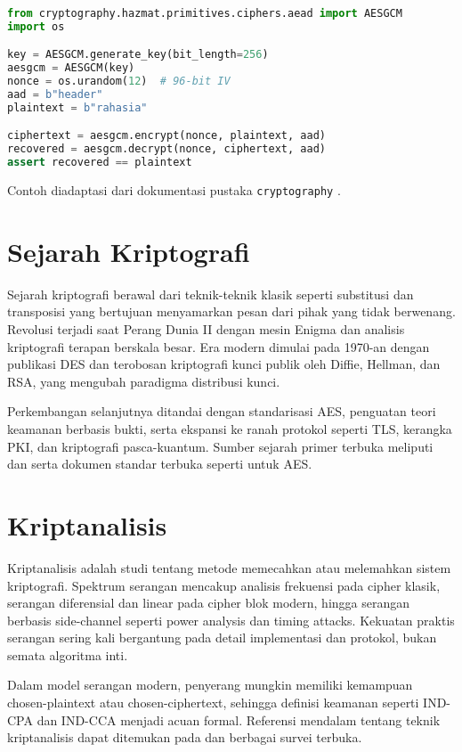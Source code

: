 \documentclass[../main.tex]{subfiles}
\begin{document}
\begin{lstlisting}[language=Python, caption={Contoh enkripsi-dekripsi AES-GCM di Python}, label={lst:aesgcm}]
from cryptography.hazmat.primitives.ciphers.aead import AESGCM
import os

key = AESGCM.generate_key(bit_length=256)
aesgcm = AESGCM(key)
nonce = os.urandom(12)  # 96-bit IV
aad = b"header"
plaintext = b"rahasia"

ciphertext = aesgcm.encrypt(nonce, plaintext, aad)
recovered = aesgcm.decrypt(nonce, ciphertext, aad)
assert recovered == plaintext
\end{lstlisting}

\noindent Contoh diadaptasi dari dokumentasi pustaka \texttt{cryptography} \parencite{cryptography-aesgcm-docs}.

\section{Sejarah Kriptografi}
Sejarah kriptografi berawal dari teknik-teknik klasik seperti substitusi dan transposisi yang bertujuan menyamarkan pesan dari pihak yang tidak berwenang. Revolusi terjadi saat Perang Dunia II dengan mesin Enigma dan analisis kriptografi terapan berskala besar. Era modern dimulai pada 1970-an dengan publikasi DES dan terobosan kriptografi kunci publik oleh Diffie, Hellman, dan RSA, yang mengubah paradigma distribusi kunci.

Perkembangan selanjutnya ditandai dengan standarisasi AES, penguatan teori keamanan berbasis bukti, serta ekspansi ke ranah protokol seperti TLS, kerangka PKI, dan kriptografi pasca-kuantum. Sumber sejarah primer terbuka meliputi \textcite{diffie1976new} dan \textcite{rsa1978} serta dokumen standar terbuka seperti \textcite{fips197} untuk AES.

\section{Kriptanalisis}
Kriptanalisis adalah studi tentang metode memecahkan atau melemahkan sistem kriptografi. Spektrum serangan mencakup analisis frekuensi pada cipher klasik, serangan diferensial dan linear pada cipher blok modern, hingga serangan berbasis side-channel seperti power analysis dan timing attacks. Kekuatan praktis serangan sering kali bergantung pada detail implementasi dan protokol, bukan semata algoritma inti.

Dalam model serangan modern, penyerang mungkin memiliki kemampuan chosen-plaintext atau chosen-ciphertext, sehingga definisi keamanan seperti IND-CPA dan IND-CCA menjadi acuan formal. Referensi mendalam tentang teknik kriptanalisis dapat ditemukan pada \textcite{biham1991differential,kocher1999dpa} dan berbagai survei terbuka.
\end{document}
